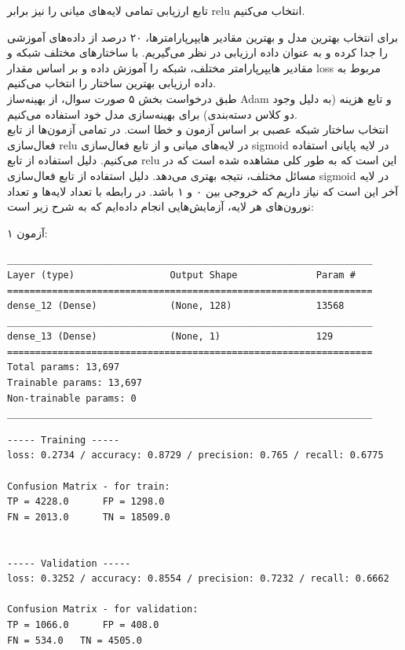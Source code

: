 \documentclass{article}
\begin{document}
تابع ارزیابی تمامی لایه‌های میانی را نیز برابر relu انتخاب می‌کنیم.

برای انتخاب بهترین مدل و بهترین مقادیر هایپرپارامترها، ۲۰ درصد از داده‌های آموزشی را جدا کرده و به عنوان داده ارزیابی در نظر می‌گیریم. با ساختارهای مختلف شبکه و مقادیر هایپرپارامتر مختلف، شبکه را آموزش داده و بر اساس مقدار  loss مربوط به داده ارزیابی بهترین ساختار را انتخاب می‌کنیم. \\

طبق درخواست بخش ۵ صورت سوال، از بهینه‌ساز Adam و تابع هزینه  (به دلیل وجود دو کلاس دسته‌بندی) برای بهینه‌سازی مدل خود استفاده می‌کنیم. \\

انتخاب ساختار شبکه عصبی بر اساس آزمون و خطا است. در تمامی آزمون‌ها از تابع فعال‌سازی relu در لایه‌های میانی و از تابع فعال‌سازی sigmoid در لایه پایانی استفاده می‌کنیم. دلیل استفاده از تابع relu این است که به طور کلی مشاهده شده است که در مسائل مختلف، نتیجه بهتری می‌دهد. دلیل استفاده از تابع فعال‌سازی sigmoid در لایه‌ آخر این است که نیاز داریم که خروجی بین ۰ و ۱ باشد. در رابطه با تعداد لایه‌ها و تعداد نورون‌های هر لایه، آزمایش‌هایی انجام داده‌ایم که به شرح زیر است:



آزمون ۱:

\begin{latin}
\begin{lstlisting}
_________________________________________________________________
Layer (type)                 Output Shape              Param #   
=================================================================
dense_12 (Dense)             (None, 128)               13568     
_________________________________________________________________
dense_13 (Dense)             (None, 1)                 129       
=================================================================
Total params: 13,697
Trainable params: 13,697
Non-trainable params: 0
_________________________________________________________________
\end{lstlisting}
\end{latin}


\begin{latin}
\begin{lstlisting}
----- Training -----
loss: 0.2734 / accuracy: 0.8729 / precision: 0.765 / recall: 0.6775 

Confusion Matrix - for train:
TP = 4228.0 	 FP = 1298.0
FN = 2013.0 	 TN = 18509.0


----- Validation -----
loss: 0.3252 / accuracy: 0.8554 / precision: 0.7232 / recall: 0.6662 

Confusion Matrix - for validation:
TP = 1066.0 	 FP = 408.0
FN = 534.0 	 TN = 4505.0
\end{lstlisting}
\end{latin}
\end{document}
